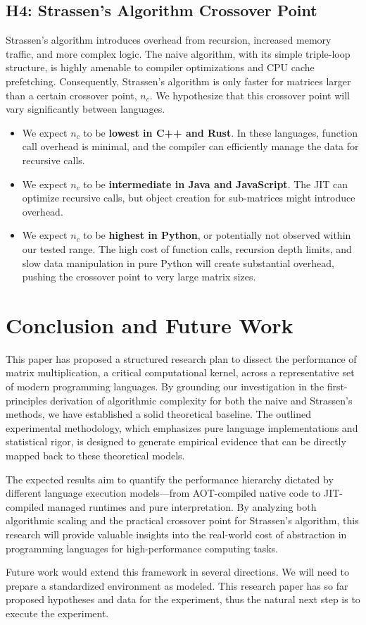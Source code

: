 \documentclass[11pt, a4paper, titlepage]{scrartcl}
\begin{document}
\subsection{H4: Strassen's Algorithm Crossover Point}
Strassen's algorithm introduces overhead from recursion, increased memory traffic, and more complex logic. The naive algorithm, with its simple triple-loop structure, is highly amenable to compiler optimizations and CPU cache prefetching. Consequently, Strassen's algorithm is only faster for matrices larger than a certain crossover point, \(n_c\). We hypothesize that this crossover point will vary significantly between languages.
\begin{itemize}
    \item We expect \(n_c\) to be \textbf{lowest in C++ and Rust}. In these languages, function call overhead is minimal, and the compiler can efficiently manage the data for recursive calls.
    \item We expect \(n_c\) to be \textbf{intermediate in Java and JavaScript}. The JIT can optimize recursive calls, but object creation for sub-matrices might introduce overhead.
    \item We expect \(n_c\) to be \textbf{highest in Python}, or potentially not observed within our tested range. The high cost of function calls, recursion depth limits, and slow data manipulation in pure Python will create substantial overhead, pushing the crossover point to very large matrix sizes.
\end{itemize}
\newpage

\section{Conclusion and Future Work}
This paper has proposed a structured research plan to dissect the performance of matrix multiplication, a critical computational kernel, across a representative set of modern programming languages. By grounding our investigation in the first-principles derivation of algorithmic complexity for both the naive and Strassen's methods, we have established a solid theoretical baseline. The outlined experimental methodology, which emphasizes pure language implementations and statistical rigor, is designed to generate empirical evidence that can be directly mapped back to these theoretical models.

The expected results aim to quantify the performance hierarchy dictated by different language execution models—from AOT-compiled native code to JIT-compiled managed runtimes and pure interpretation. By analyzing both algorithmic scaling and the practical crossover point for Strassen's algorithm, this research will provide valuable insights into the real-world cost of abstraction in programming languages for high-performance computing tasks.

Future work would extend this framework in several directions. We will need to prepare a standardized environment as modeled. This research paper has so far proposed hypotheses and data for the experiment, thus the natural next step is to execute the experiment.
\newpage

\printbibliography[heading=bibnumbered] %
\end{document}
